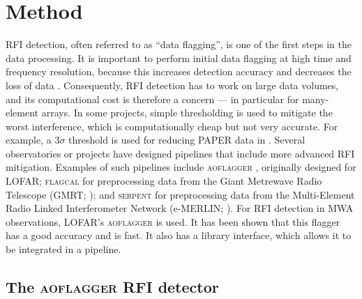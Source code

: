 \documentclass{pasa}
\begin{document}
\section{Method}
RFI detection, often referred to as ``data flagging'', is one of the first steps in the data processing. It is important to perform initial data flagging at high time and frequency resolution, because this increases detection accuracy and decreases the loss of data \citep{lofar-radio-environment}. Consequently, RFI detection has to work on large data volumes, and its computational cost is therefore a concern --- in particular for many-element arrays. In some projects, simple thresholding is used to mitigate the worst interference, which is computationally cheap but not very accurate. For example, a $3\sigma$ threshold is used for reducing PAPER data in \citet{parsons-paper-eorlimit-2014}. Several observatories or projects have designed pipelines that include more advanced RFI mitigation. Examples of such pipelines include \textsc{aoflagger} \citep{post-correlation-rfi-classification,scale-invariant-rank-operator}, originally designed for LOFAR; \textsc{flagcal} for preprocessing data from the Giant Metrewave Radio Telescope (GMRT; \citealt{prasad-flagcal-2012}); and \textsc{serpent} for preprocessing data from the Multi-Element Radio Linked Interferometer Network (e-MERLIN; \citealt{serpent-peck-2013}). For RFI detection in MWA observations, LOFAR's \textsc{aoflagger} is used. It has been shown that this flagger has a good accuracy and is fast. It also has a library interface, which allows it to be integrated in a pipeline.

\subsection{The \textsc{aoflagger} RFI detector}
\end{document}

